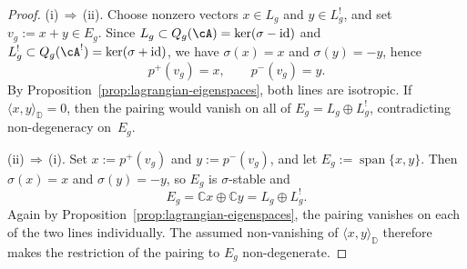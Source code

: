 \begin{proof}
\textup{(i)}\,$\Rightarrow$\,\textup{(ii)}.
Choose nonzero vectors $x \in L_g$ and $y \in L_g^!$, and set
$v_g := x+y \in E_g$.
Since $L_g \subset Q_g(\cA)=\ker(\sigma-\mathrm{id})$ and
$L_g^! \subset Q_g(\cA^!)=\ker(\sigma+\mathrm{id})$, we have
$\sigma(x)=x$ and $\sigma(y)=-y$, hence
\[
p^+(v_g)=x, \qquad p^-(v_g)=y.
\]
By Proposition~\ref{prop:lagrangian-eigenspaces}, both lines are
isotropic.  If $\langle x,y\rangle_{\mathbb{D}}=0$, then the pairing
would vanish on all of $E_g=L_g\oplus L_g^!$, contradicting
non-degeneracy on~$E_g$.

\textup{(ii)}\,$\Rightarrow$\,\textup{(i)}.
Set $x:=p^+(v_g)$ and $y:=p^-(v_g)$, and let
$E_g := \operatorname{span}\{x,y\}$.
Then $\sigma(x)=x$ and $\sigma(y)=-y$, so $E_g$ is $\sigma$-stable and
\[
E_g = \mathbb{C}x \oplus \mathbb{C}y = L_g \oplus L_g^!.
\]
Again by Proposition~\ref{prop:lagrangian-eigenspaces}, the pairing
vanishes on each of the two lines individually.  The assumed
non-vanishing of $\langle x,y\rangle_{\mathbb{D}}$ therefore makes the
restriction of the pairing to $E_g$ non-degenerate.
\end{proof}

